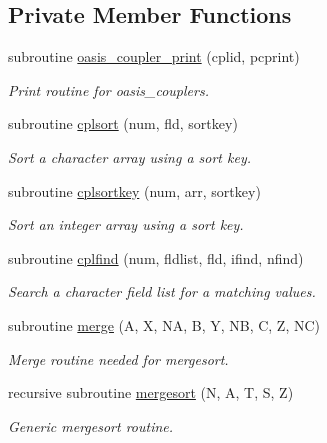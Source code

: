 \subsection*{Private Member Functions}
\begin{DoxyCompactItemize}
\item 
subroutine \hyperlink{classmod__oasis__coupler_a5cb96db0ae7b837db934689a49df3da6}{oasis\+\_\+coupler\+\_\+print} (cplid, pcprint)
\begin{DoxyCompactList}\small\item\em Print routine for oasis\+\_\+couplers. \end{DoxyCompactList}\item 
subroutine \hyperlink{classmod__oasis__coupler_a2748a288ff923c3b9c1aa5d0df6c8a30}{cplsort} (num, fld, sortkey)
\begin{DoxyCompactList}\small\item\em Sort a character array using a sort key. \end{DoxyCompactList}\item 
subroutine \hyperlink{classmod__oasis__coupler_a5604cb46a58d69c208b4bc166b2b28d8}{cplsortkey} (num, arr, sortkey)
\begin{DoxyCompactList}\small\item\em Sort an integer array using a sort key. \end{DoxyCompactList}\item 
subroutine \hyperlink{classmod__oasis__coupler_a773e323d2275aff227e05e98ce97def1}{cplfind} (num, fldlist, fld, ifind, nfind)
\begin{DoxyCompactList}\small\item\em Search a character field list for a matching values. \end{DoxyCompactList}\item 
subroutine \hyperlink{classmod__oasis__coupler_aaef001fff7e7f3cb23eb913433efcb87}{merge} (A, X, N\+A, B, Y, N\+B, C, Z, N\+C)
\begin{DoxyCompactList}\small\item\em Merge routine needed for mergesort. \end{DoxyCompactList}\item 
recursive subroutine \hyperlink{classmod__oasis__coupler_a31a0d796e69ec189baf149ad806f97c6}{mergesort} (N, A, T, S, Z)
\begin{DoxyCompactList}\small\item\em Generic mergesort routine. \end{DoxyCompactList}\end{DoxyCompactItemize}
